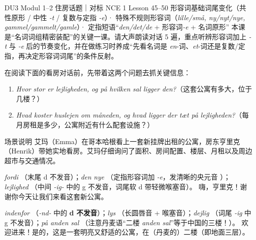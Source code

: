 {DU3 Modul 1--2 住房话题｜对标 NCE 1 Lesson 45--50}
{形容词基础词尾变化（共性原形 / 中性 \textit{-t} / 复数与定指 \textit{-e}）· 特殊不规则形容词（\textit{lille/små, ny/nyt/nye, gammel/gammelt/gamle}）· 定指短语“\textit{den/det/de} + 形容词\textit{-e} + 名词原形”}
{本课是“名词词组精密装配”的关键一课。请大声朗读对话 5 遍，重点听辨形容词加上 \textit{-t} 与 \textit{-e} 后的节奏变化，并在做练习时养成“先看名词是 \textit{en}-词、\textit{et}-词还是复数/定指，再决定形容词词尾”的条件反射。}

\begin{foerduleaeser}
在阅读下面的看房对话前，先带着这两个问题去抓关键信息：
\begin{enumerate}
  \item \textit{Hvor stor er lejligheden, og på hvilken sal ligger den?}（这套公寓有多大，位于几楼？）
  \item \textit{Hvad koster huslejen om måneden, og hvad ligger der tæt på lejligheden?}（每月房租是多少，公寓附近有什么配套设施？）
\end{enumerate}
\end{foerduleaeser}


\begin{tipbox}{场景说明}
艾玛（Emma）在哥本哈根看上一套新挂牌出租的公寓，房东亨里克（Henrik）带她实地看房。艾玛仔细询问了面积、房间配置、楼层、月租以及周边超市与交通情况。
\end{tipbox}

{\textit{fordi} （末尾 d 不发音）；\textit{den nye} （定指形容词加 \textit{-e}，发清晰的央元音 ）；\textit{lejlighed} （中间 \textit{-ig-} 中的 g 不发音，词尾软 d 带轻微喉塞音）。}
{嗨，亨里克！谢谢你今天让我们来看这套新公寓。}

{\textit{indenfor} （\textit{-nd-} 中的 \textbf{d 不发音}）；\textit{lys} （长圆唇音  + 喉塞音）；\textit{dejlig} （词尾 \textit{-ig} 中 g 不发音）；\textit{på anden sal} （注意丹麦语“二楼 \textit{anden sal}”等于中国的三楼！）。}
{欢迎进来！是的，这是一套明亮又舒适的公寓，在（丹麦的）二楼（即地面三层）。}

